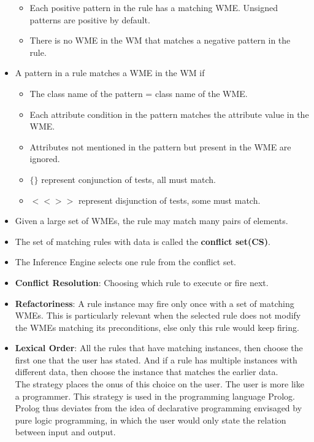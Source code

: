 \documentclass[a4paper]{article}
\begin{document}
\begin{itemize}
    \begin{itemize}
        \item Each positive pattern in the rule has a matching WME. Unsigned patterns are positive by default.
        \item There is no WME in the WM that matches a negative pattern in the rule.
    \end{itemize}
    \item A pattern in a rule matches a WME in the WM if
    \begin{itemize}
        \item The class name of the pattern = class name of the WME.
        \item Each attribute condition in the pattern matches the attribute value in the WME.
        \item Attributes not mentioned in the pattern but present in the WME are ignored.
        \item $\{\}$ represent conjunction of tests, all must match.
        \item $<<>>$ represent disjunction of tests, some must match.
    \end{itemize}
    \item Given a large set of WMEs, the rule may match many pairs of elements.
    \item The set of matching rules with data is called the \textbf{conflict set(CS)}.
    \item The Inference Engine selects one rule from the conflict set.
    \item \textbf{Conflict Resolution}: Choosing which rule to execute or fire next.
    \item \textbf{Refactoriness}: A rule instance may fire only once with a set of matching WMEs. This is particularly relevant when the selected rule does not modify the WMEs matching its preconditions, else only this rule would keep firing.
    \item \textbf{Lexical Order}: All the rules that have matching instances, then choose the first one that the user has stated. And if a rule has multiple instances with different data, then choose the instance that matches the earlier data.\\
    The strategy places the onus of this choice on the user. The user is more like a programmer. This strategy is used in the programming language Prolog.\\
    Prolog thus deviates from the idea of declarative programming envisaged by pure logic programming, in which the user would only state the relation between input and output.

\end{itemize}
\end{document}
